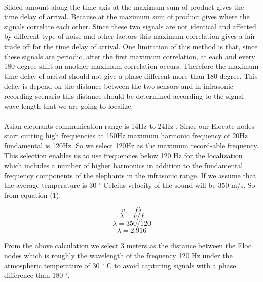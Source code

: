 \documentclass[12pt]{article}
\numberwithin{figure}{section}
\numberwithin{table}{section}
\begin{document}
\paragraph{}
Slided amount along the time axis at the maximum sum of product gives the time delay of arrival. Because at the maximum sum of product gives where the signals correlate each other. Since these two signals are not identical and affected by different type of noise and other factors this maximum correlation gives a fair trade off for the time delay of arrival. One limitation of this method is that, since these signals are periodic, after the first maximum correlation, at each and every 180 degree shift an another maximum correlation occurs. Therefore the maximum time delay of arrival should not give a phase different more than 180 degree. This delay is depend on the distance between the two sensors and in infrasonic recording scenario this distance should be determined according to the signal wave length that we are going to localize. 

\paragraph{}
Asian elephants communication range is 14Hz to 24Hz \cite{2}. Since our Elocate nodes start cutting high frequencies at 150Hz maximum harmonic frequency of 20Hz fundamental is 120Hz. So we select 120Hz as the maximum record-able frequency. This selection enables us to use frequencies below 120 Hz for the localization which includes a number of higher harmonics in addition to the fundamental frequency components of the elephants in the infrasonic range. If we assume that the average temperature is 30 $^{\circ}$ Celcius velocity of the sound will be 350 m/s. So from equation (1).

\begin{equation}
v=f\lambda
\end{equation}
\begin{equation}
\lambda=v/f
\end{equation}
\begin{equation}
\lambda=350/120
\end{equation}
\begin{equation}
\lambda=2.916
\end{equation}

From the above calculation we select 3 meters as the distance between the Eloc nodes which is roughly the wavelength of the frequency 120 Hz under the atmospheric temperature of 30 $^{\circ}$ C to avoid capturing signals with a phase difference than 180 $^{\circ}$.
\end{document}

